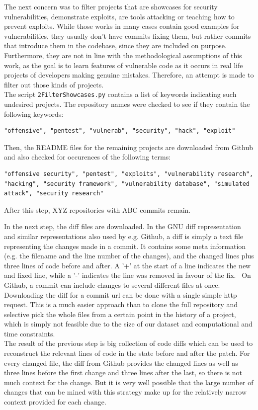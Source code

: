 \documentclass[
	a4paper,
	pagesize,
	pdftex,
	12pt,
	twoside, %
	BCOR=5mm, %
	ngerman,
	fleqn,
	final,
	]{scrartcl}
\begin{document}
The next concern was to filter projects that are showcases for security vulnerabilities, demonstrate exploits, are tools attacking or teaching how to prevent exploits. While those works in many cases contain good examples for vulnerabilities, they usually don't have commits fixing them, but rather commits that introduce them in the codebase, since they are included on purpose. Furthermore, they are not in line with the methodological assumptions of this work, as the goal is to learn features of vulnerable code as it occurs in real life projects of developers making genuine mistakes. Therefore, an attempt is made to filter out those kinds of projects.\\
The script \texttt{2FilterShowcases.py} contains a list of keywords indicating such undesired projects. The repository names were checked to see if they contain the following keywords:
\begin{lstlisting}
"offensive", "pentest", "vulnerab", "security", "hack", "exploit"
\end{lstlisting}
Then, the README files for the remaining projects are downloaded from Github and also checked for occurences of the following terms:
\begin{lstlisting}
"offensive security", "pentest", "exploits", "vulnerability research", "hacking", "security framework", "vulnerability database", "simulated attack", "security research"
\end{lstlisting}
After this step, XYZ repositories with ABC commits remain.

In the next step, the diff files are downloaded. In the GNU diff representation and similar representations also used by e.g. Github, a diff is simply a text file representing the changes made in a commit. It contains some meta information (e.g. the filename and the line number of the changes), and the changed lines plus three lines of code before and after. A '+' at the start of a line indicates the new and fixed line, while a '-' indicates the line was removed in favour of the fix.~\cite{Liu.2018} On Github, a commit can include changes to several different files at once.\\
Downloading the diff for a commit url can be done with a single simple http request. This is a much easier approach than to clone the full repository and selective pick the whole files from a certain point in the history of a project, which is simply not feasible due to the size of our dataset and computational and time constraints. \\
The result of the previous step is big collection of code diffs which can be used to reconstruct the relevant lines of code in the state before and after the patch. For every changed file, the diff from Github provides the changed lines as well as three lines before the first change and three lines after the last, so there is not much context for the change. 
But it is very well possible that the large number of changes that can be mined with this strategy make up for the relatively narrow context provided for each change.
\end{document}
